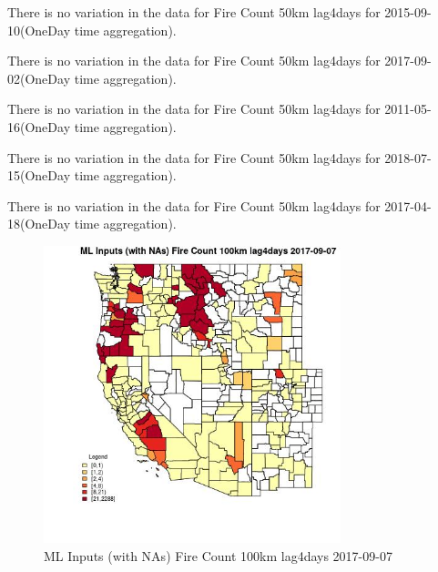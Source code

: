 There is no variation in the data for Fire Count 50km lag4days for 2015-09-10(OneDay time aggregation). 
 

There is no variation in the data for Fire Count 50km lag4days for 2017-09-02(OneDay time aggregation). 
 

There is no variation in the data for Fire Count 50km lag4days for 2011-05-16(OneDay time aggregation). 
 

There is no variation in the data for Fire Count 50km lag4days for 2018-07-15(OneDay time aggregation). 
 

There is no variation in the data for Fire Count 50km lag4days for 2017-04-18(OneDay time aggregation). 
 

\begin{figure} 
\centering  
\includegraphics[width=0.77\textwidth]{Code_Outputs/Report_ML_input_PM25_Step4_part_e_de_duplicated_aves_compiled_2019-05-21wNAs_CountyFire_Count_100km_lag4daysMean2017-09-07.jpg} 
\caption{\label{fig:Report_ML_input_PM25_Step4_part_e_de_duplicated_aves_compiled_2019-05-21wNAsCountyFire_Count_100km_lag4daysMean2017-09-07}ML Inputs (with NAs) Fire Count 100km lag4days 2017-09-07} 
\end{figure} 
 

